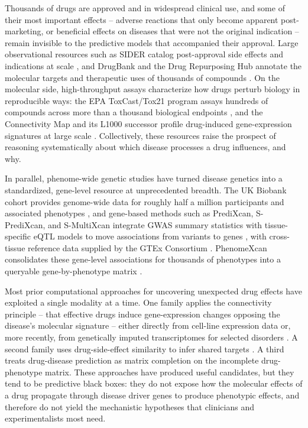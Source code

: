 \documentclass[11pt]{article}
\begin{document}
Thousands of drugs are approved and in widespread clinical use, and some
of their most important effects -- adverse reactions that only become
apparent post-marketing, or beneficial effects on diseases that were not
the original indication -- remain invisible to the predictive models that
accompanied their approval. Large observational resources such as SIDER
catalog post-approval side effects and indications at scale
\citep{kuhn2016sider}, and DrugBank and the Drug Repurposing Hub annotate
the molecular targets and therapeutic uses of thousands of compounds
\citep{knox2024drugbank,corsello2017repurposing}. On the molecular side,
high-throughput assays characterize how drugs perturb biology in
reproducible ways: the EPA ToxCast/Tox21 program assays hundreds of
compounds across more than a thousand biological endpoints
\citep{richard2016toxcast}, and the Connectivity Map and its L1000
successor profile drug-induced gene-expression signatures at large scale
\citep{lamb2006cmap,subramanian2017lincs}. Collectively, these resources
raise the prospect of reasoning systematically about which disease
processes a drug influences, and why.

In parallel, phenome-wide genetic studies have turned disease genetics
into a standardized, gene-level resource at unprecedented breadth. The UK
Biobank cohort provides genome-wide data for roughly half a million
participants and associated phenotypes \citep{bycroft2018ukbiobank}, and
gene-based methods such as PrediXcan, S-PrediXcan, and S-MultiXcan
integrate GWAS summary statistics with tissue-specific eQTL models to
move associations from variants to genes
\citep{gamazon2015predixcan,barbeira2018spredixcan,barbeira2019smultixcan},
with cross-tissue reference data supplied by the GTEx Consortium
\citep{gtex2020atlas}. PhenomeXcan consolidates these gene-level
associations for thousands of phenotypes into a queryable
gene-by-phenotype matrix \citep{pividori2020phenomexcan}.

Most prior computational approaches for uncovering unexpected drug
effects have exploited a single modality at a time. One family applies
the connectivity principle -- that effective drugs induce gene-expression
changes opposing the disease's molecular signature -- either directly
from cell-line expression data \citep{lamb2006cmap,sirota2011drugrepo}
or, more recently, from genetically imputed transcriptomes for selected
disorders \citep{so2017neuropsychiatric,reay2020pes,grotzinger2023tsem}.
A second family uses drug-side-effect similarity to infer shared targets
\citep{campillos2008sideeffect}. A third treats drug-disease prediction
as matrix completion on the incomplete drug-phenotype matrix. These
approaches have produced useful candidates, but they tend to be
predictive black boxes: they do not expose how the molecular effects of
a drug propagate through disease driver genes to produce phenotypic
effects, and therefore do not yield the mechanistic hypotheses that
clinicians and experimentalists most need.
\end{document}
